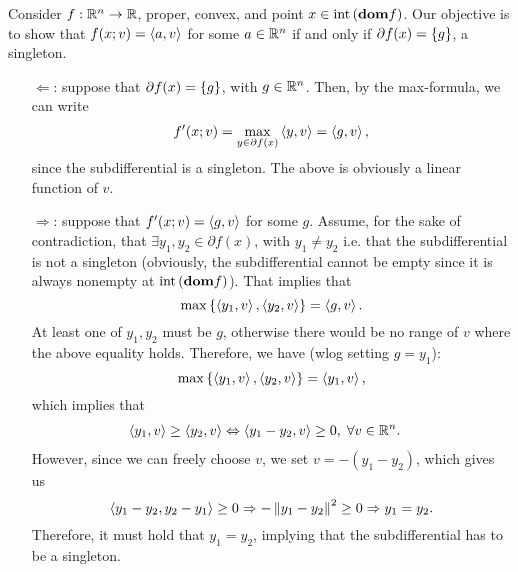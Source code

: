 \documentclass[10pt]{article}
\begin{document}
\begin{Exercise}
	\label{ex:p3}
	Consider $f: \mathbb{R}^n \to \mathbb{R}$, proper, convex, and point $x \in \mathrm{int}\left( \textbf{dom}
	f \right)$. Our objective is to show that $f(x; v) = \left\langle a, v \right\rangle$ for some $a \in
	\mathbb{R}^n$ if and only if $\partial f(x) = \left\{ g \right\}$, a singleton.
	\begin{itemize}
		\item[$\Leftarrow$:] suppose that $\partial f(x) = \left\{ g \right\}$, with $g
			\in \mathbb{R}^n$. Then, by the max-formula, we can write
			\[
				f'(x; v) = \max_{y \in \partial f(x)} \left\langle y, v \right\rangle =
					\left\langle g, v \right\rangle,
			\]
			since the subdifferential is a singleton. The above is obviously a
			linear function of $v$.
		\item[$\Rightarrow$:] suppose that $f'(x; v) = \left\langle g, v \right\rangle$ for some $g$.
			Assume, for the sake of contradiction, that $\exists y_1, y_2
			\in \partial f(x)$, with $y_1 \neq y_2$ i.e. that the subdifferential is not a
			singleton (obviously, the subdifferential cannot be empty since it
			is always nonempty at $\mathrm{int}\left( \textbf{dom} f \right)$). That implies that
			\[
				\max\left\{ \left\langle y_1, v \right\rangle, \left\langle y_2, v \right\rangle \right\} = \left\langle g, v \right\rangle.
			\]
			At least one of $y_1, y_2$ must be $g$, otherwise there would be no
			range of $v$ where the above equality holds. Therefore, we have
			(wlog setting $g = y_1$):
			\[
				\max\left\{ \left\langle y_1, v \right\rangle, \left\langle y_2, v \right\rangle \right\} = \left\langle y_1, v \right\rangle,
			\]
			which implies that
			\begin{align*}
				\left\langle y_1, v \right\rangle &\geq \left\langle y_2, v \right\rangle \Leftrightarrow
				\left\langle y_1 - y_2, v \right\rangle \geq 0, \; \forall v \in \mathbb{R}^n.
			\end{align*}
			However, since we can freely choose $v$, we set $v = -(y_1 - y_2)$,
			which gives us
			\[
				\left\langle y_1 - y_2, y_2 - y_1 \right\rangle \geq 0 \Rightarrow
				-\left \| y_1 - y_2 \right \|^2 \geq 0 \Rightarrow y_1 = y_2.
			\]
			Therefore, it must hold that $y_1 = y_2$, implying that the
			subdifferential has to be a singleton.
	\end{itemize}
\end{Exercise}
\end{document}
